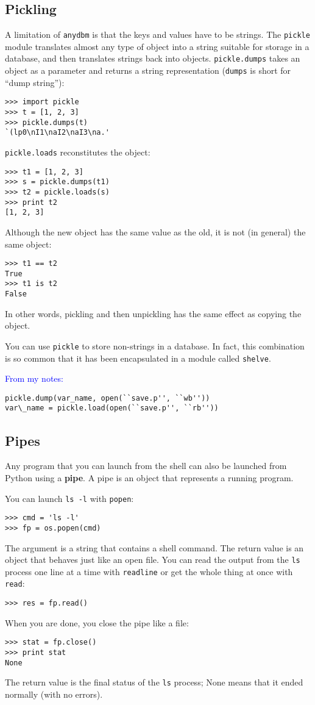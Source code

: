 \documentclass{article}
\begin{document}
\subsection{Pickling}
A limitation of \verb|anydbm| is that the keys and values have to be
strings. The \verb|pickle| module translates almost any type of object
into a string suitable for storage in a database, and then translates
strings back into objects. \verb|pickle.dumps| takes an object as a
parameter and returns a string representation (\verb|dumps| is short
for ``dump string''):
\begin{verbatim}
>>> import pickle
>>> t = [1, 2, 3]
>>> pickle.dumps(t)
`(lp0\nI1\naI2\naI3\na.'
\end{verbatim}
\verb|pickle.loads| reconstitutes the object:
\begin{verbatim}
>>> t1 = [1, 2, 3]
>>> s = pickle.dumps(t1)
>>> t2 = pickle.loads(s)
>>> print t2
[1, 2, 3]
\end{verbatim}
Although the new object has the same value as the old, it is not (in
general) the same object:
\begin{verbatim}
>>> t1 == t2
True
>>> t1 is t2
False
\end{verbatim}
In other words, pickling and then unpickling has the same effect as
copying the object.

You can use \verb|pickle| to store non-strings in a database. In fact,
this combination is so common that it has been encapsulated in a
module called \verb|shelve|.

\textcolor{blue}{From my notes:}
\begin{verbatim}
pickle.dump(var_name, open(``save.p'', ``wb''))
var\_name = pickle.load(open(``save.p'', ``rb''))
\end{verbatim}

\subsection{Pipes} %
Any program that you can launch from the shell can also be launched
from Python using a {\bf pipe}. A pipe is an object that represents a
running program.

You can launch \verb|ls -l| with \verb|popen|:
\begin{verbatim}
>>> cmd = 'ls -l'
>>> fp = os.popen(cmd)
\end{verbatim}
The argument is a string that contains a shell command. The return
value is an object that behaves just like an open file. You can read
the output from the \verb|ls| process one line at a time with \verb|readline|
or get the whole thing at once with \verb|read|: 
\begin{verbatim}
>>> res = fp.read()
\end{verbatim}
When you are done, you close the pipe like a file:
\begin{verbatim}
>>> stat = fp.close()
>>> print stat
None
\end{verbatim}
The return value is the final status of the \verb|ls| process;
None means that it ended normally (with no errors).
\end{document}
